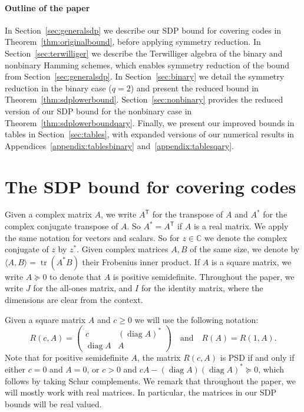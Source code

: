 \documentclass[10pt,a4paper]{article}
\newcommand{\C}{\mathbb{C}}
\theoremstyle{definition}
\newcommand{\inner}[2]{\langle#1,#2\rangle}
\newcommand{\T}{^{\mathsf{T}}}
\DeclareMathOperator*{\diag}{diag}
\DeclareMathOperator*{\tr}{tr}
\begin{document}
\paragraph{Outline of the paper}
In Section~\ref{sec:generalsdp} we describe our SDP bound for covering codes in Theorem~\ref{thm:originalbound}, before applying symmetry reduction. In Section~\ref{sec:terwilliger} we describe the Terwilliger algebra of the binary and nonbinary Hamming schemes, which enables symmetry reduction of the bound from Section~\ref{sec:generalsdp}. In Section~\ref{sec:binary} we detail the symmetry reduction in the binary case ($q=2$) and present the reduced bound in Theorem~\ref{thm:sdplowerbound}. Section~\ref{sec:nonbinary} provides the reduced version of our SDP bound for the nonbinary case in Theorem~\ref{thm:sdplowerboundqary}. 
Finally, we present our improved bounds in tables in Section~\ref{sec:tables}, with expanded versions of our numerical results in Appendices~\ref{appendix:tablesbinary} and~\ref{appendix:tablesqary}.


\section{The SDP bound for covering codes \label{sec:generalsdp}}
Given a complex matrix $A$, we write $A\T$ for the transpose of $A$ and $A^*$ for the complex conjugate transpose of $A$. So $A^*=A\T$ if $A$ is a real matrix. We apply the same notation for vectors and scalars. So for $z\in \C$ we denote the complex conjugate of $z$ by $z^*$. Given complex matrices $A,B$ of the same size, we denote by $\inner{A}{B}=\tr (A^*B)$ their Frobenius inner product. If $A$ is a square matrix, we write $A\succeq 0$ to denote that $A$ is positive semidefinite. Throughout the paper, we write $J$ for the all-ones matrix, and $I$ for the identity matrix, where the dimensions are clear from the context.

Given a square matrix $A$ and $c\geq 0$ we will use the following notation:
\[
R(c,A)=\begin{pmatrix}c&(\diag A)^*\\\diag A&A \end{pmatrix}\quad \text{and}\quad R(A)=R(1,A).
\]
Note that for positive semidefinite $A$, the matrix $R(c,A)$ is PSD if and only if either $c=0$ and $A=0$, or $c > 0$ and $cA - (\diag A)(\diag A)^* \succeq 0$, which follows by taking Schur complements. 
We remark that throughout the paper, we will mostly work with real matrices. In particular, the matrices in our SDP bounds will be real valued.  
\end{document}
